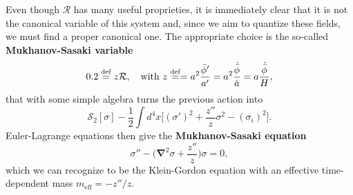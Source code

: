 Even though $\mathcal{R}$ has many useful proprieties, it is immediately clear that it is not the canonical variable of this system and, since we aim to quantize these fields, we must find a proper canonical one. The appropriate choice is the so-called \textbf{Mukhanov-Sasaki variable}
\begin{equation}
    0.2\stackrel{\text{def}}{=} z\mathcal{R},\quad \text{with }z\stackrel{\text{def}}{=}=a^2\frac{\bar\phi'}{a'}=a^2\frac{\dot{\bar\phi}}{\dot{a}}=a\frac{\dot{\bar\phi}}{H},\label{eq:SM-variable}
\end{equation}
that with some simple algebra turns the previous action into
\begin{equation}
    \mathcal{S}_{2}[\sigma ]-\frac{1}{2}\int d^4x \Big[(\sigma')^2+\frac{z''}{z}\sigma^2-(\sigma_i)^2\Big].   \label{eq:SM-action}
\end{equation}
Euler-Lagrange equations then give the \textbf{Mukhanov-Sasaki equation}
\begin{equation}
    \sigma''-\bigg(\boldsymbol{\nabla}^2\sigma+\frac{z''}{z}\bigg)\sigma=0,\label{eq:SM-equation}
\end{equation}
which we can recognize to be the Klein-Gordon equation with an effective time-dependent mass $m_\text{eff}=-z''/z$.


